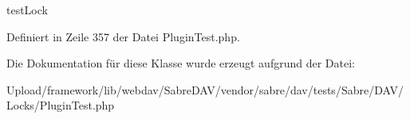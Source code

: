 test\+Lock 

Definiert in Zeile 357 der Datei Plugin\+Test.\+php.



Die Dokumentation für diese Klasse wurde erzeugt aufgrund der Datei\+:\begin{DoxyCompactItemize}
\item 
Upload/framework/lib/webdav/\+Sabre\+D\+A\+V/vendor/sabre/dav/tests/\+Sabre/\+D\+A\+V/\+Locks/Plugin\+Test.\+php\end{DoxyCompactItemize}
